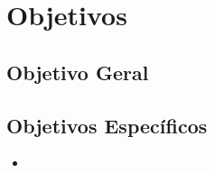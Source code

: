 \section{Objetivos}\label{sec:objetivos}
\subsection{Objetivo Geral}\label{sec:objetivo-geral}


\subsection{Objetivos Específicos}\label{sec:objetivos-especificos}
\begin{itemize}
    \item 
\end{itemize}